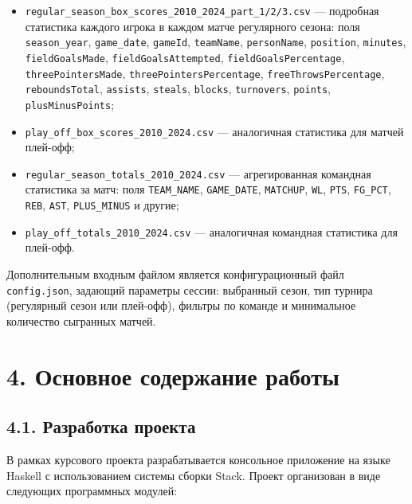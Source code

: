 \documentclass[a4paper, final]{article}
\begin{document}
\begin{itemize}
    \item \texttt{regular\_season\_box\_scores\_2010\_2024\_part\_1/2/3.csv} — подробная статистика каждого игрока в каждом матче регулярного сезона: поля \texttt{season\_year}, \texttt{game\_date}, \texttt{gameId}, \texttt{teamName}, \texttt{personName}, \texttt{position}, \texttt{minutes}, \texttt{fieldGoalsMade}, \texttt{fieldGoalsAttempted}, \texttt{fieldGoalsPercentage}, \texttt{threePointersMade}, \texttt{threePointersPercentage}, \texttt{freeThrowsPercentage}, \texttt{reboundsTotal}, \texttt{assists}, \texttt{steals}, \texttt{blocks}, \texttt{turnovers}, \texttt{points}, \texttt{plusMinusPoints};

    \item \texttt{play\_off\_box\_scores\_2010\_2024.csv} — аналогичная статистика для матчей плей-офф;

    \item \texttt{regular\_season\_totals\_2010\_2024.csv} — агрегированная командная статистика за матч: поля \texttt{TEAM\_NAME}, \texttt{GAME\_DATE}, \texttt{MATCHUP}, \texttt{WL}, \texttt{PTS}, \texttt{FG\_PCT}, \texttt{REB}, \texttt{AST}, \texttt{PLUS\_MINUS} и другие;

    \item \texttt{play\_off\_totals\_2010\_2024.csv} — аналогичная командная статистика для плей-офф.
\end{itemize}

Дополнительным входным файлом является конфигурационный файл \texttt{config.json}, задающий параметры сессии: выбранный сезон, тип турнира (регулярный сезон или плей-офф), фильтры по команде и минимальное количество сыгранных матчей.

\newpage

\section*{4. Основное содержание работы}

\subsection*{4.1. Разработка проекта}

В рамках курсового проекта разрабатывается консольное приложение на языке Haskell с использованием системы сборки Stack. Проект организован в виде следующих программных модулей:
\end{document}
